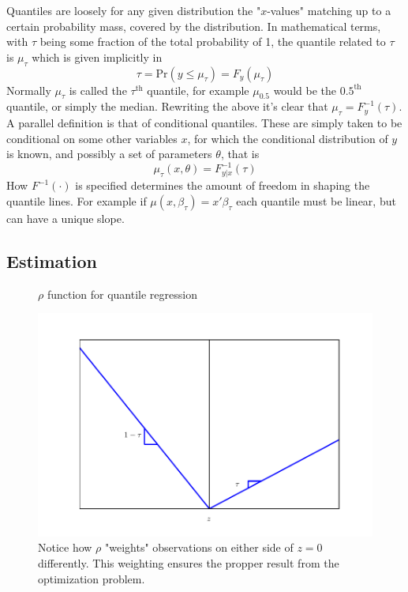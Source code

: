 Quantiles are loosely for any given distribution the "$x$-values" matching up to a certain probability mass, covered by the distribution. In mathematical terms, with $\tau$ being some fraction of the total probability of 1, the quantile related to $\tau$ is $\mu_{\tau}$ which is given implicitly in
\begin{equation}
\tau = \textrm{Pr}(y \leq \mu_{\tau}) = F_{y}(\mu_{\tau})
\end{equation}
Normally $\mu_{\tau}$ is called the $\tau^{\textrm{th}}$ quantile, for example $\mu_{0.5}$ would be the $0.5^{\textrm{th}}$ quantile, or simply the median. Rewriting the above it's clear that $\mu_{\tau}=F^{-1}_y(\tau)$.
A parallel definition is that of conditional quantiles. These are simply taken to be conditional on some other variables $x$, for which the conditional distribution of $y$ is known, and possibly a set of parameters $\theta$, that is
\begin{equation}
\mu_{\tau}(x, \theta) = F^{-1}_{y|x}(\tau)
\end{equation}
How $F^{-1}(\cdot)$ is specified determines the amount of freedom in shaping the quantile lines. For example if $\mu(x, \beta_{\tau})=x' \beta_{\tau}$ each quantile must be linear, but can have a unique slope.

\subsection{Estimation}

\begin{figure}
\caption{$\rho$ function for quantile regression}
\label{fig: rhofunc}
\includegraphics[width = \linewidth]{figures/rho}
\caption*{Notice how $\rho$ "weights" observations on either side of $z=0$ differently. This weighting ensures the propper result from the optimization problem.}
\end{figure}

